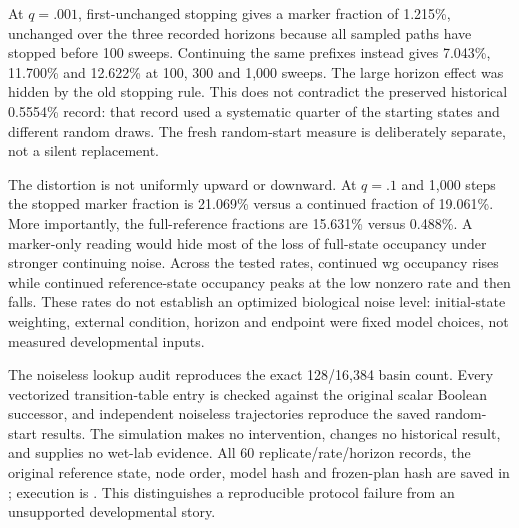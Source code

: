 At $q=.001$, first-unchanged stopping gives a marker fraction of 1.215\%, unchanged over the three recorded horizons because all sampled paths have stopped before 100 sweeps. Continuing the same prefixes instead gives 7.043\%, 11.700\% and 12.622\% at 100, 300 and 1,000 sweeps. The large horizon effect was hidden by the old stopping rule. This does not contradict the preserved historical 0.5554\% record: that record used a systematic quarter of the starting states and different random draws. The fresh random-start measure is deliberately separate, not a silent replacement.

The distortion is not uniformly upward or downward. At $q=.1$ and 1,000 steps the stopped marker fraction is 21.069\% versus a continued fraction of 19.061\%. More importantly, the full-reference fractions are 15.631\% versus 0.488\%. A marker-only reading would hide most of the loss of full-state occupancy under stronger continuing noise. Across the tested rates, continued wg occupancy rises while continued reference-state occupancy peaks at the low nonzero rate and then falls. These rates do not establish an optimized biological noise level: initial-state weighting, external condition, horizon and endpoint were fixed model choices, not measured developmental inputs.

The noiseless lookup audit reproduces the exact 128/16,384 basin count. Every vectorized transition-table entry is checked against the original scalar Boolean successor, and independent noiseless trajectories reproduce the saved random-start results. The simulation makes no intervention, changes no historical result, and supplies no wet-lab evidence. All 60 replicate/rate/horizon records, the original reference state, node order, model hash and frozen-plan hash are saved in ; execution is . This distinguishes a reproducible protocol failure from an unsupported developmental story.

